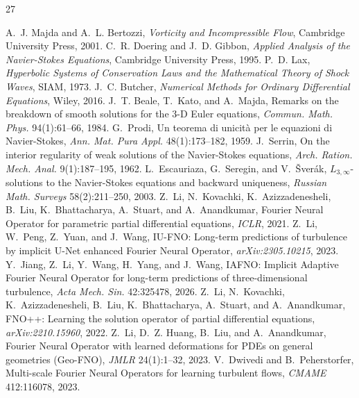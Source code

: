 \documentclass[review]{elsarticle}
\begin{document}


\begin{thebibliography}{27}

 A.~J. Majda and A.~L. Bertozzi, \emph{Vorticity and Incompressible Flow}, Cambridge University Press, 2001.
 C.~R. Doering and J.~D. Gibbon, \emph{Applied Analysis of the Navier-Stokes Equations}, Cambridge University Press, 1995.
 P.~D. Lax, \emph{Hyperbolic Systems of Conservation Laws and the Mathematical Theory of Shock Waves}, SIAM, 1973.
 J.~C. Butcher, \emph{Numerical Methods for Ordinary Differential Equations}, Wiley, 2016.
 J.~T. Beale, T.~Kato, and A.~Majda, Remarks on the breakdown of smooth solutions for the 3-D Euler equations, \emph{Commun. Math. Phys.} 94(1):61--66, 1984.
 G.~Prodi, Un teorema di unicit\`a per le equazioni di Navier-Stokes, \emph{Ann. Mat. Pura Appl.} 48(1):173--182, 1959.
 J.~Serrin, On the interior regularity of weak solutions of the Navier-Stokes equations, \emph{Arch. Ration. Mech. Anal.} 9(1):187--195, 1962.
 L.~Escauriaza, G.~Seregin, and V.~\v{S}ver\'{a}k, $L_{3,\infty}$-solutions to the Navier-Stokes equations and backward uniqueness, \emph{Russian Math. Surveys} 58(2):211--250, 2003.
 Z.~Li, N.~Kovachki, K.~Azizzadenesheli, B.~Liu, K.~Bhattacharya, A.~Stuart, and A.~Anandkumar, Fourier Neural Operator for parametric partial differential equations, \emph{ICLR}, 2021.
 Z.~Li, W.~Peng, Z.~Yuan, and J.~Wang, IU-FNO: Long-term predictions of turbulence by implicit U-Net enhanced Fourier Neural Operator, \emph{arXiv:2305.10215}, 2023.
 Y.~Jiang, Z.~Li, Y.~Wang, H.~Yang, and J.~Wang, IAFNO: Implicit Adaptive Fourier Neural Operator for long-term predictions of three-dimensional turbulence, \emph{Acta Mech. Sin.} 42:325478, 2026.
 Z.~Li, N.~Kovachki, K.~Azizzadenesheli, B.~Liu, K.~Bhattacharya, A.~Stuart, and A.~Anandkumar, FNO++: Learning the solution operator of partial differential equations, \emph{arXiv:2210.15960}, 2022.
 Z.~Li, D.~Z. Huang, B.~Liu, and A.~Anandkumar, Fourier Neural Operator with learned deformations for PDEs on general geometries (Geo-FNO), \emph{JMLR} 24(1):1--32, 2023.
 V.~Dwivedi and B.~Peherstorfer, Multi-scale Fourier Neural Operators for learning turbulent flows, \emph{CMAME} 412:116078, 2023.

\end{thebibliography}
\end{document}
